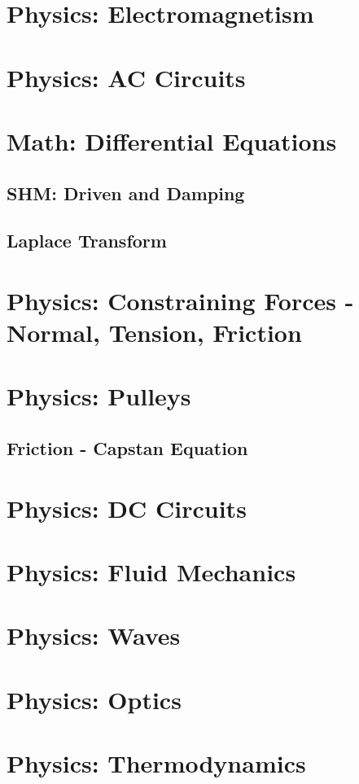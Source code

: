 \documentclass{article}
\begin{document}
\section{Physics: Electromagnetism}
\section{Physics: AC Circuits}

\section{Math: Differential Equations}
\subsection{SHM: Driven and Damping}
\subsection{Laplace Transform}

\section{Physics: Constraining Forces - Normal, Tension, Friction}
\section{Physics: Pulleys}
\subsection{Friction - Capstan Equation}
\section{Physics: DC Circuits}
\section{Physics: Fluid Mechanics}
\section{Physics: Waves}
\section{Physics: Optics}
\section{Physics: Thermodynamics}
\end{document}
